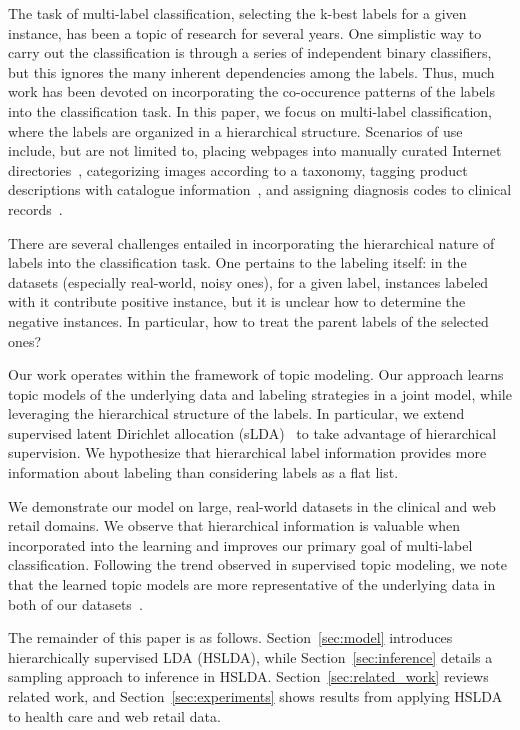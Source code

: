 The task of multi-label classification, selecting the k-best labels for a given
instance, has been a topic of research for several years. One simplistic way to
carry out the classification is through a series of independent binary
classifiers, but this ignores the many inherent dependencies among the
labels. Thus, much work has been devoted on incorporating the co-occurence
patterns of the labels into the classification task. In this paper, we focus on
multi-label classification, where the labels are organized in a hierarchical
structure. Scenarios of use include, but are not limited to, placing webpages
into manually curated Internet directories~\cite{DMOZ}, categorizing images
according to a taxonomy, tagging product descriptions with catalogue
information~\cite{SNAP}, and assigning diagnosis codes to clinical
records~\cite{Challenge07}.

There are several challenges entailed in incorporating the hierarchical nature
of labels into the classification task. One pertains to the labeling itself: in
the datasets (especially real-world, noisy ones), for a given label, instances
labeled with it contribute positive instance, but it is unclear how to
determine the negative instances. In particular, how to treat the parent labels
of the selected ones? 

Our work operates within the framework of topic modeling. Our approach learns
topic models of the underlying data and labeling strategies in a joint model,
while leveraging the hierarchical structure of the labels. In particular, we
extend supervised latent Dirichlet allocation (sLDA)~\cite{BleiMcAuliffe2008}
to take advantage of hierarchical supervision. We hypothesize that hierarchical
label information provides more information about labeling than considering
labels as a flat list.

We demonstrate our model on large, real-world datasets in the clinical and web
retail domains. We observe that hierarchical information is valuable when
incorporated into the learning and improves our primary goal of multi-label
classification. Following the trend observed in supervised topic modeling, we
note that the learned topic models are more representative of the underlying
data in both of our datasets~\cite{BleiMcAuliffe2008}.

The remainder of this paper is as follows. Section~\ref{sec:model}
introduces hierarchically supervised LDA (HSLDA), while
Section~\ref{sec:inference} details a sampling approach to inference in HSLDA. 
Section~\ref{sec:related_work} reviews related work, and
Section~\ref{sec:experiments} shows results from applying HSLDA to health care
and web retail data.  

